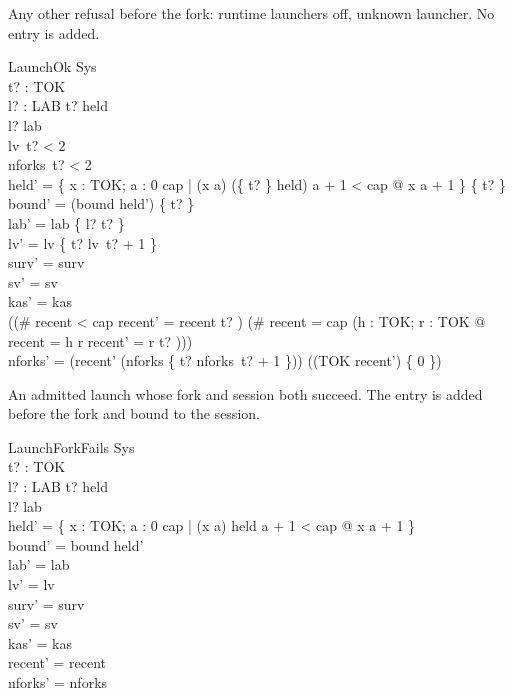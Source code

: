 \documentclass[a4paper,10pt,fleqn]{article}
\begin{document}
Any other refusal before the fork: runtime launchers off, unknown launcher. No entry is added.

\begin{schema}{LaunchOk}
  \Delta Sys \\
  t? : TOK \\ l? : LAB
\where
  t? \notin \dom held \\
  l? \notin \dom lab \\
  lv~t? < 2 \\
  nforks~t? < 2 \\
  held' = \{ x : TOK; a : 0 \upto cap | (x \mapsto a) \in (\{ t? \} \ndres held) \land a + 1 < cap @ x \mapsto a + 1 \} \cup \{ t?  \} \\
  bound' = (bound \cap \dom held') \cup \{ t? \} \\
  lab' = lab \cup \{ l? \mapsto t? \} \\
  lv' = lv \oplus \{ t? \mapsto lv~t? + 1 \} \\
  surv' = surv \\
  sv' = sv \\
  kas' = kas \\
  ((\# recent < cap \land recent' = recent \cat \langle t? \rangle) \lor (\# recent = cap \land (\exists h : TOK; r : \seq TOK @ recent = \langle h \rangle \cat r \land recent' = r \cat \langle t? \rangle))) \\
  nforks' = (\ran recent' \dres (nforks \oplus \{ t? \mapsto nforks~t? + 1 \})) \cup ((TOK \setminus \ran recent') \cross \{ 0 \})
\end{schema}

An admitted launch whose fork and session both succeed. The entry is added before the fork and bound to the session.

\begin{schema}{LaunchForkFails}
  \Delta Sys \\
  t? : TOK \\ l? : LAB
\where
  t? \notin \dom held \\
  l? \notin \dom lab \\
  held' = \{ x : TOK; a : 0 \upto cap | (x \mapsto a) \in held \land a + 1 < cap @ x \mapsto a + 1 \} \\
  bound' = bound \cap \dom held' \\
  lab' = lab \\
  lv' = lv \\
  surv' = surv \\
  sv' = sv \\
  kas' = kas \\
  recent' = recent \\
  nforks' = nforks
\end{schema}
\end{document}
